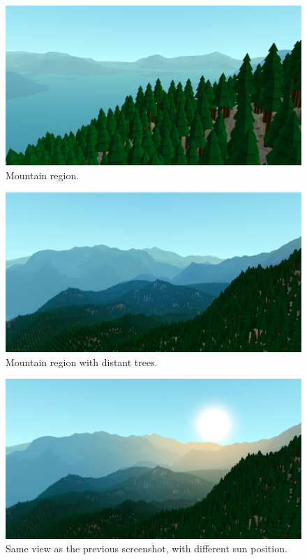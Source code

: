 \begin{figure}
	\centering
		\includegraphics[width=1.0\textwidth]{figures/Screenshot000002.png}
	\caption{Mountain region.}
	\label{fig:screenshot02}
\end{figure}

\begin{figure}
	\centering
		\includegraphics[width=1.0\textwidth]{figures/Screenshot000003.png}
	\caption{Mountain region with distant trees.}
	\label{fig:screenshot03}
\end{figure}

\begin{figure}
	\centering
		\includegraphics[width=1.0\textwidth]{figures/Screenshot000004.png}
	\caption{Same view as the previous screenshot, with different sun position.}
	\label{fig:screenshot04}
\end{figure}

